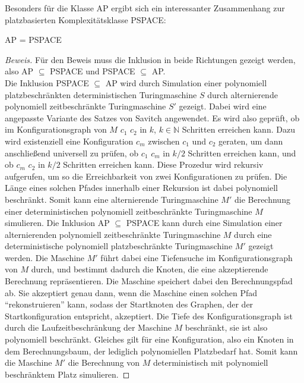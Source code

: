 Besonders für die Klasse AP ergibt sich ein interessanter Zusammenhang zur platzbasierten Komplexitätsklasse PSPACE:


\begin{theorem}
    AP = PSPACE
\end{theorem}

\begin{proof}[Beweis] \cite[S.411-412]{sipser_introduction_2012}
    Für den Beweis muss die Inklusion in beide Richtungen gezeigt werden, also AP $\subseteq$ PSPACE und PSPACE $\subseteq$ AP. \\
    Die Inklusion PSPACE $\subseteq$ AP wird durch Simulation einer polynomiell platzbeschränkten deterministischen Turingmaschine $S$ durch alternierende polynomiell zeitbeschränkte Turingmaschine $S'$ gezeigt.
    Dabei wird eine angepasste Variante des Satzes von Savitch angewendet. Es wird also geprüft, ob im Konfigurationsgraph von $M$ $c_1$ $c_2$ in $k$, $k \in \mathbb{N}$ Schritten erreichen kann.
    Dazu wird existenziell eine Konfiguration $c_m$ zwischen $c_1$ und $c_2$ geraten, um dann anschließend universell zu prüfen, 
    ob $c_1$ $c_m$ in $k/2$ Schritten erreichen kann, und ob $c_m$ $c_2$ in $k/2$ Schritten erreichen kann. Diese Prozedur wird rekursiv aufgerufen,
    um so die Erreichbarkeit von zwei Konfigurationen zu prüfen. Die Länge eines solchen Pfades innerhalb einer Rekursion ist dabei polynomiell beschränkt.
    Somit kann eine alternierende Turingmaschine $M'$ die Berechnung einer deterministischen polynomiell zeitbeschränkte Turingmaschine $M$ simulieren.  
    Die Inklusion AP $\subseteq$ PSPACE kann durch eine Simulation einer alternierenden polynomiell zeitbeschränkte Turingmaschine $M$ durch eine deterministische polynomiell platzbeschränkte Turingmaschine $M'$
    gezeigt werden. Die Maschine $M'$ führt dabei eine Tiefensuche im Konfigurationsgraph von $M$ durch, und bestimmt dadurch die Knoten, die eine akzeptierende Berechnung repräsentieren.
    Die Maschine speichert dabei den Berechnungspfad ab. Sie akzeptiert genau dann, wenn die Maschine einen solchen Pfad \enquote{rekonstruieren} kann, sodass der Startknoten des Graphen,
    der der Startkonfiguration entspricht, akzeptiert.
    Die Tiefe des Konfigurationsgraph ist durch die Laufzeitbeschränkung der Maschine $M$ beschränkt, sie ist also polynomiell beschränkt. Gleiches gilt für eine Konfiguration, also ein Knoten in dem Berechnungsbaum,
    der lediglich polynomiellen Platzbedarf hat. Somit kann die Maschine $M'$ die Berechnung von $M$ deterministisch mit polynomiell beschränktem Platz simulieren. 
\end{proof}